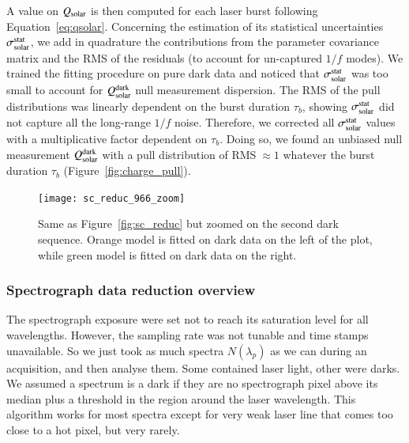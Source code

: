 A value on $Q_{\mathrm{solar}}$ is then computed for each laser burst following Equation~\ref{eq:qsolar}. Concerning the estimation of its statistical uncertainties $\sigma_{\mathrm{solar}}^{\mathrm{stat}}$, we add in quadrature the contributions from the parameter covariance matrix and the RMS of the residuals (to account for un-captured $1/f$ modes). We trained the fitting procedure on pure dark data and noticed that $\sigma_{\mathrm{solar}}^{\mathrm{stat}}$ was too small to account for $Q_{\mathrm{solar}}^{\rm dark}$ null measurement dispersion. The RMS of the pull distributions was linearly dependent on the burst duration $\tau_b$, showing $\sigma_{\mathrm{solar}}^{\mathrm{stat}}$ did not capture all the long-range $1/f$ noise. Therefore, we corrected all $\sigma_{\mathrm{solar}}^{\mathrm{stat}}$ values with a multiplicative factor dependent on $\tau_b$. Doing so, we found an unbiased null measurement $Q_{\mathrm{solar}}^{\rm dark}$ with a pull distribution of RMS$\;\approx 1$ whatever the burst duration $\tau_b$ (Figure~\ref{fig:charge_pull}). 

\begin{figure}[!h]
\centering
\texttt{[image: sc\_reduc\_966\_zoom]}
\caption{Same as Figure~\ref{fig:sc_reduc} but zoomed on the second dark sequence. Orange model is fitted on dark data on the left of the plot, while green model is fitted on dark data on the right.}\label{fig:sc_reduc_zoom}
\end{figure}


\subsubsection{Spectrograph data reduction overview}
\label{sec:spectro_reduction}

The spectrograph exposure were set not to reach its saturation level for all wavelengths. However, the sampling rate was not tunable and time stamps unavailable. So we just took as much spectra $N(\lambda_p)$ as we can during an acquisition, and then analyse them. Some contained laser light, other were darks. We assumed a spectrum is a dark if they are no spectrograph pixel above its median plus a threshold in the region around the laser wavelength. This algorithm works for most spectra except for very weak laser line that comes too close to a hot pixel, but very rarely.

